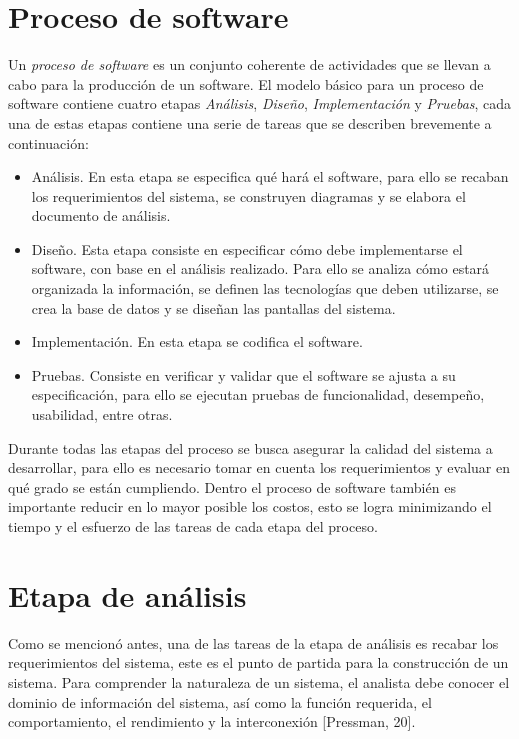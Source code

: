 \section{Proceso de software}
Un \emph{proceso de software} es un conjunto coherente de actividades que se llevan a cabo para la producción de un software. 
El modelo básico para un proceso de software contiene cuatro etapas \emph{Análisis}, \emph{Diseño}, \emph{Implementación} y \emph{Pruebas}, 
cada una de estas etapas contiene una serie de tareas que se describen brevemente a continuación:

\begin{itemize}
	\item Análisis. En esta etapa se especifica qué hará el software, para ello se recaban los requerimientos del sistema, se construyen diagramas y se elabora el documento de análisis.
	\item Diseño. Esta etapa consiste en especificar cómo debe implementarse el software, con base en el análisis realizado. Para ello se analiza cómo estará organizada la información, se definen las tecnologías que deben utilizarse, 
		se crea la base de datos y se diseñan las pantallas del sistema.
	\item Implementación. En esta etapa se codifica el software.
	\item Pruebas. Consiste en verificar y validar que el software se ajusta a su especificación, para ello se ejecutan pruebas de funcionalidad, desempeño, usabilidad, entre otras.
\end{itemize}

Durante todas las etapas del proceso se busca asegurar la calidad del sistema a desarrollar, para ello es necesario tomar en cuenta los requerimientos y evaluar en qué grado se están cumpliendo. Dentro el proceso de
software también es importante reducir en lo mayor posible los costos, esto se logra minimizando el tiempo y el esfuerzo de las tareas de cada etapa del proceso.\\


\section{Etapa de análisis}
Como se mencionó antes, una de las tareas de la etapa de análisis es recabar los requerimientos del sistema, este es el punto de partida para la construcción de un sistema. Para comprender la naturaleza de un sistema, 
el analista debe conocer el dominio de información del sistema, así como la función requerida, el comportamiento, el rendimiento y la interconexión [Pressman, 20].\\

